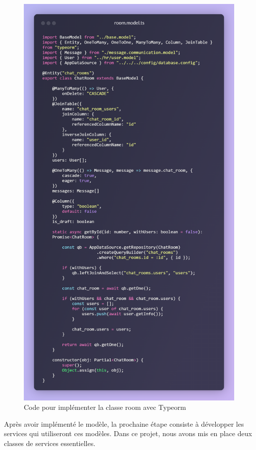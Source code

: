 \begin{figure}[H]
    \centering
    \includegraphics[width=13.5cm]{assets/annexes/snippet (3).png}
    \caption{Code pour implémenter la classe room avec Typeorm}
\end{figure}

\clearpage

Après avoir implémenté le modèle, la prochaine étape consiste à développer les services qui utiliseront ces modèles. Dans ce projet, nous avons mis en place deux classes de services essentielles.

